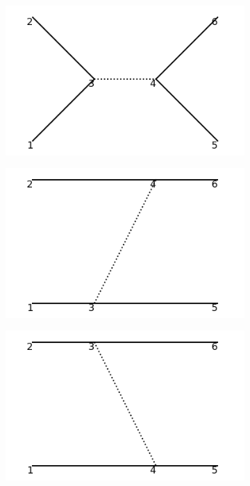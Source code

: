 \documentclass[11pt,a4paper,twoside,pdf]{article}
\numberwithin{equation}{section}
\begin{document}
\begin{figure}[h!]
    \centering
    \begin{subfigure}[t]{0.24\textwidth}
        \centering
        \includegraphics[width=\textwidth]{plots/canonical/order2/4.png}
        \caption{ }
    \end{subfigure}%
    \begin{subfigure}[t]{0.24\textwidth}
        \centering
        \includegraphics[width=\textwidth]{plots/canonical/order2/5.png}
        \caption{ }
    \end{subfigure}
    \begin{subfigure}[t]{0.24\textwidth}
        \centering
        \includegraphics[width=\textwidth]{plots/canonical/order2/6.png}

\end{subfigure}
\end{figure}
\end{document}

